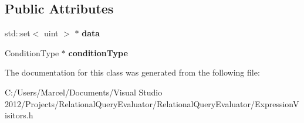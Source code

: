 \subsection*{Public Attributes}
\begin{DoxyCompactItemize}
\item 
\hypertarget{class_join_info_reading_expression_visitor_aa74d0cd4070b81c0eb6bf5870fa000d3}{std\+::set$<$ uint $>$ $\ast$ {\bfseries data}}\label{class_join_info_reading_expression_visitor_aa74d0cd4070b81c0eb6bf5870fa000d3}

\item 
\hypertarget{class_join_info_reading_expression_visitor_af7219e9cb55b9a59763a06df0656a63f}{Condition\+Type $\ast$ {\bfseries condition\+Type}}\label{class_join_info_reading_expression_visitor_af7219e9cb55b9a59763a06df0656a63f}

\end{DoxyCompactItemize}


The documentation for this class was generated from the following file\+:\begin{DoxyCompactItemize}
\item 
C\+:/\+Users/\+Marcel/\+Documents/\+Visual Studio 2012/\+Projects/\+Relational\+Query\+Evaluator/\+Relational\+Query\+Evaluator/Expression\+Visitors.\+h\end{DoxyCompactItemize}
